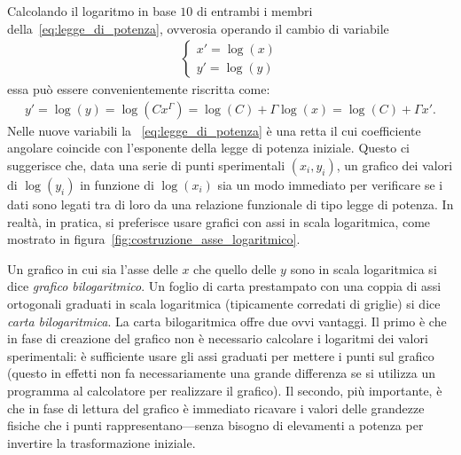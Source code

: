 Calcolando il logaritmo in base $10$ di entrambi i membri della~\eqref{eq:legge_di_potenza},
ovverosia operando il cambio di variabile
\begin{align*}
  \begin{cases}
    x' = \log(x)\\
    y' = \log(y)
  \end{cases}
\end{align*}
essa può essere convenientemente riscritta come:
\begin{align}\label{eq:legge_di_potenza_newvar}
  y' = \log(y) = \log(Cx^\Gamma) = \log(C) + \Gamma\log(x) = \log(C) + \Gamma x'.
\end{align}
Nelle nuove variabili la ~\eqref{eq:legge_di_potenza} è una retta il cui
coefficiente angolare coincide con l'esponente della legge di potenza iniziale.
Questo ci suggerisce che, data una serie di punti sperimentali $(x_i, y_i)$, un
grafico dei valori di $\log(y_i)$ in funzione di $\log(x_i)$ sia un modo
immediato per verificare se i dati sono legati tra di loro da una relazione
funzionale di tipo legge di potenza. In realtà, in pratica, si preferisce
usare grafici con assi in scala logaritmica, come mostrato in
figura~\ref{fig:costruzione_asse_logaritmico}.

Un grafico in cui sia l'asse delle $x$ che quello delle $y$ sono in scala
logaritmica si dice \emph{grafico bilogaritmico}. Un foglio di carta
prestampato con una coppia di assi ortogonali graduati in scala logaritmica
(tipicamente corredati di griglie) si dice \emph{carta bilogaritmica}.
La carta bilogaritmica offre due ovvi vantaggi. Il primo è che in fase di
creazione del grafico non è necessario calcolare i logaritmi dei valori
sperimentali: è sufficiente usare gli assi graduati per mettere i punti sul
grafico (questo in effetti non fa necessariamente una grande differenza se si
utilizza un programma al calcolatore per realizzare il grafico).
Il secondo, più importante, è che in fase di lettura del grafico
è immediato ricavare i valori delle grandezze fisiche che i punti
rappresentano---senza bisogno di elevamenti a potenza per invertire la
trasformazione iniziale.


